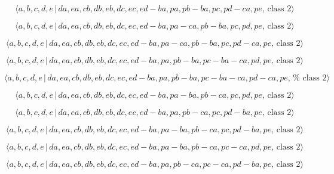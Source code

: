 \documentclass[10pt]{article}
\begin{document}
\begin{equation}
\langle a,b,c,d,e\,|\,da,ea,cb,db,eb,dc,ec,ed-ba,pa,pb-ba,pc,pd-ca,pe,\,%
\text{class }2\rangle  \tag{7.4686}
\end{equation}

\begin{equation}
\langle a,b,c,d,e\,|\,da,ea,cb,db,eb,dc,ec,ed-ba,pa-ca,pb-ba,pc,pd,pe,\,%
\text{class }2\rangle  \tag{7.4687}
\end{equation}

\begin{equation}
\langle a,b,c,d,e\,|\,da,ea,cb,db,eb,dc,ec,ed-ba,pa-ca,pb-ba,pc,pd-ca,pe,\,%
\text{class }2\rangle  \tag{7.4688}
\end{equation}

\begin{equation}
\langle a,b,c,d,e\,|\,da,ea,cb,db,eb,dc,ec,ed-ba,pa,pb-ba,pc-ba-ca,pd,pe,\,%
\text{class }2\rangle  \tag{7.4689}
\end{equation}

\begin{equation}
\langle
a,b,c,d,e\,|\,da,ea,cb,db,eb,dc,ec,ed-ba,pa,pb-ba,pc-ba-ca,pd-ca,pe,\,\text{%
class }2\rangle  \tag{7.4690}
\end{equation}

\begin{equation}
\langle a,b,c,d,e\,|\,da,ea,cb,db,eb,dc,ec,ed-ba,pa-ba,pb-ca,pc,pd,pe,\,%
\text{class }2\rangle  \tag{7.4691}
\end{equation}

\begin{equation}
\langle a,b,c,d,e\,|\,da,ea,cb,db,eb,dc,ec,ed-ba,pa,pb-ca,pc,pd-ba,pe,\,%
\text{class }2\rangle  \tag{7.4692}
\end{equation}

\begin{equation}
\langle a,b,c,d,e\,|\,da,ea,cb,db,eb,dc,ec,ed-ba,pa-ba,pb-ca,pc,pd-ba,pe,\,%
\text{class }2\rangle  \tag{7.4693}
\end{equation}

\begin{equation}
\langle a,b,c,d,e\,|\,da,ea,cb,db,eb,dc,ec,ed-ba,pa-ba,pb-ca,pc-ca,pd,pe,\,%
\text{class }2\rangle  \tag{7.4694}
\end{equation}

\begin{equation}
\langle a,b,c,d,e\,|\,da,ea,cb,db,eb,dc,ec,ed-ba,pa,pb-ca,pc-ca,pd-ba,pe,\,%
\text{class }2\rangle  \tag{7.4695}
\end{equation}
\end{document}
